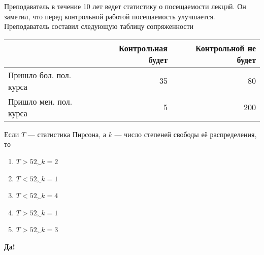 \documentclass[t]{beamer}
\begin{document}
 \begin{frame} \label{47-Yes} 
\begin{block}{47} 

Преподаватель в течение 10 лет ведет статистику о посещаемости лекций. Он заметил, что перед контрольной работой посещаемость улучшается. Преподаватель составил следующую таблицу сопряженности

\small
\begin{tabular}{lrr}
	\toprule
	& Контрольная будет & Контрольной не будет \\
	\midrule
	Пришло бол. пол. курса & 35 & 80 \\
	Пришло мен. пол. курса & 5 & 200 \\
	\bottomrule
\end{tabular}
\vspace{5mm}

Если $T$ — статистика Пирсона, а $k$ — число степеней свободы её распределения, то


 \end{block} 
\begin{enumerate} 
\item[] \hyperlink{47-No}{\beamergotobutton{} $T>52$, $k=2$}
\item[] \hyperlink{47-No}{\beamergotobutton{} $T<52$, $k=1$}
\item[] \hyperlink{47-No}{\beamergotobutton{} $T<52$, $k=4$}
\item[] \hyperlink{47-Yes}{\beamergotobutton{} $T>52$, $k=1$}
\item[] \hyperlink{47-No}{\beamergotobutton{} $T>52$, $k=3$}
\end{enumerate} 

 \textbf{Да!} 
 \hyperlink{48}{}\end{frame} 
\end{document}
